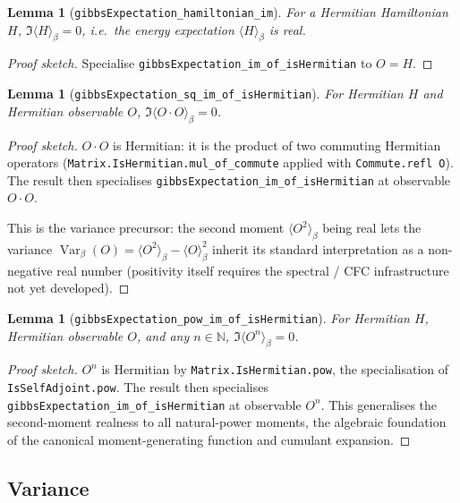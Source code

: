 \documentclass[a4paper,11pt]{article}
\newtheorem{lemma}[theorem]{Lemma}
\begin{document}
\begin{lemma}[\texttt{gibbsExpectation\_hamiltonian\_im}]
For a Hermitian Hamiltonian $H$,
$\Im\langle H \rangle_\beta = 0$, i.e.\ the energy expectation
$\langle H \rangle_\beta$ is real.
\end{lemma}

\begin{proof}[Proof sketch]
Specialise \texttt{gibbsExpectation\_im\_of\_isHermitian} to $O = H$.
\end{proof}

\begin{lemma}[\texttt{gibbsExpectation\_sq\_im\_of\_isHermitian}]
For Hermitian $H$ and Hermitian observable $O$,
$\Im\langle O \cdot O \rangle_\beta = 0$.
\end{lemma}

\begin{proof}[Proof sketch]
$O \cdot O$ is Hermitian: it is the product of two commuting
Hermitian operators (\texttt{Matrix.IsHermitian.mul\_of\_commute}
applied with \texttt{Commute.refl O}). The result then specialises
\texttt{gibbsExpectation\_im\_of\_isHermitian} at observable
$O \cdot O$.

This is the variance precursor: the second moment
$\langle O^2 \rangle_\beta$ being real lets the variance
$\operatorname{Var}_\beta(O) = \langle O^2 \rangle_\beta - \langle O \rangle_\beta^2$
inherit its standard interpretation as a non-negative real number
(positivity itself requires the spectral / CFC infrastructure not
yet developed).
\end{proof}

\begin{lemma}[\texttt{gibbsExpectation\_pow\_im\_of\_isHermitian}]
For Hermitian $H$, Hermitian observable $O$, and any $n \in \mathbb{N}$,
$\Im\langle O^n \rangle_\beta = 0$.
\end{lemma}

\begin{proof}[Proof sketch]
$O^n$ is Hermitian by \texttt{Matrix.IsHermitian.pow}, the
specialisation of \texttt{IsSelfAdjoint.pow}. The result then
specialises \texttt{gibbsExpectation\_im\_of\_isHermitian}
at observable $O^n$. This generalises the second-moment realness to
all natural-power moments, the algebraic foundation of the canonical
moment-generating function and cumulant expansion.
\end{proof}

\subsection{Variance}
\label{subsec:gibbs-variance}
\end{document}
